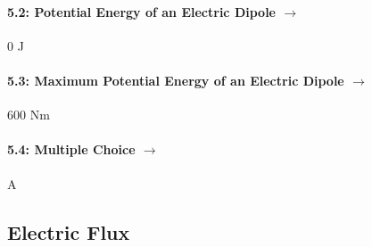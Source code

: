 \documentclass[11pt]{article}
\begin{document}
\paragraph{5.2: Potential Energy of an Electric Dipole $\rightarrow$} 0 J
\paragraph{5.3: Maximum Potential Energy of an Electric Dipole $\rightarrow$} 600 Nm
\paragraph{5.4: Multiple Choice $\rightarrow$} A

\subsection*{Electric Flux}

\end{document}
